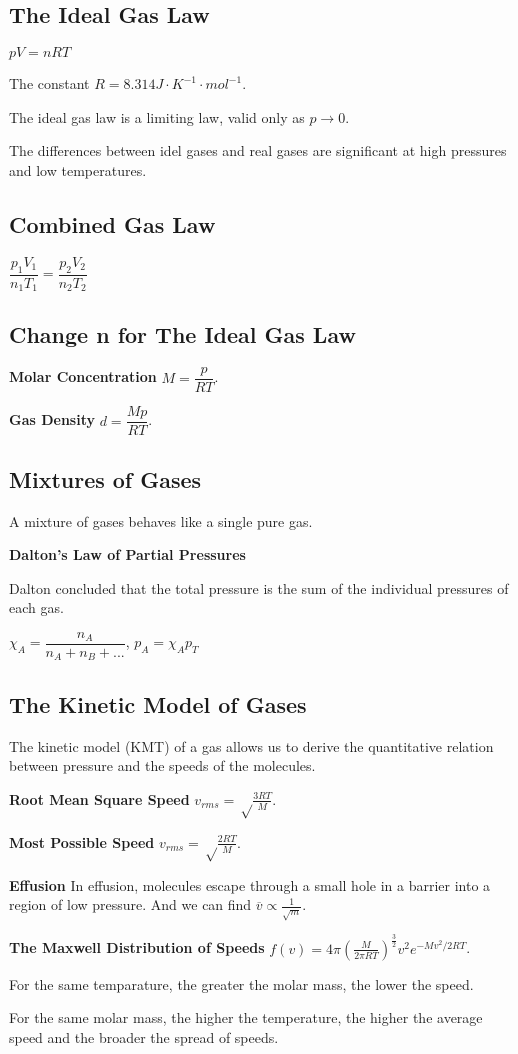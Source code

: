 \documentclass[a4paper,12pt]{article}
\begin{document}
\subsection{The Ideal Gas Law}
\begin{center}
$pV=nRT$
\end{center}\par
The constant $R = 8.314 J\cdot K^{-1}\cdot mol^{-1}$.\par
The ideal gas law is a limiting law, valid only as $p\rightarrow0$.\par
The differences between idel gases and real gases are significant at high pressures and low temperatures.
\subsection{Combined Gas Law}
\begin{center}
$\dfrac{p_{1}V_{1}}{n_{1}T_{1}}=\dfrac{p_{2}V_{2}}{n_{2}T_{2}}$
\end{center}
\subsection{Change n for The Ideal Gas Law}
\textbf{Molar Concentration} $M=\dfrac{p}{RT}$.\par
\textbf{Gas Density} $d=\dfrac{Mp}{RT}$.
\subsection{Mixtures of Gases}
A mixture of gases behaves like a single pure gas.\par
\textbf{Dalton's Law of Partial Pressures}\par
Dalton concluded that the total pressure is the sum of the individual pressures of each gas.
\begin{center}
$\chi_{A}=\dfrac{n_{A}}{n_{A}+n_{B}+...}$, $p_{A}=\chi_{A}p_{T}$
\end{center}
\subsection{The Kinetic Model of Gases}
The kinetic model (KMT) of a gas allows us to derive the quantitative relation between pressure and the speeds of the molecules.\par
\textbf{Root Mean Square Speed} $v_{rms}=\sqrt\frac{3RT}{M}$.\par
\textbf{Most Possible Speed} $v_{rms}=\sqrt\frac{2RT}{M}$.\par
\textbf{Effusion} In effusion, molecules escape through a small hole in a barrier into a region of low pressure. And we can find $\overline{v}\propto \frac{1}{\sqrt{m}}$.\par
\textbf{The Maxwell Distribution of Speeds} $f(v)=4\pi (\frac{M}{2\pi RT})^{\frac{3}{2}}v^{2}e^{-Mv^{2}/2RT}$.\par
For the same temparature, the greater the molar mass, the lower the speed.\par
For the same molar mass, the higher the temperature, the higher the average speed and the broader the spread of speeds.
\end{document}

